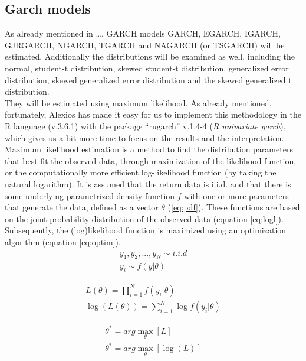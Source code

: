 \documentclass[a4paper, twoside]{templates/ociamthesis}
\begin{document}
\hypertarget{garch-models}{%
\subsection{Garch models}\label{garch-models}}

As already mentioned in \ldots, GARCH models GARCH, EGARCH, IGARCH, GJRGARCH, NGARCH, TGARCH and NAGARCH (or TSGARCH) will be estimated. Additionally the distributions will be examined as well, including the normal, student-t distribution, skewed student-t distribution, generalized error distribution, skewed generalized error distribution and the skewed generalized t distribution. ~\\

They will be estimated using maximum likelihood. As already mentioned, fortunately, Alexios \textcite{alexios2020} has made it easy for us to implement this methodology in the R language (v.3.6.1) with the package ``rugarch'' v.1.4-4 (\emph{R univariate garch}), which gives us a bit more time to focus on the results and the interpretation.~\\

Maximum likelihood estimation is a method to find the distribution parameters that best fit the observed data, through maximization of the likelihood function, or the computationally more efficient log-likelihood function (by taking the natural logarithm). It is assumed that the return data is i.i.d. and that there is some underlying parametrized density function \(f\) with one or more parameters that generate the data, defined as a vector \(\theta\) (\eqref{eq:pdf}). These functions are based on the joint probability distribution of the observed data (equation \eqref{eq:logl}). Subsequently, the (log)likelihood function is maximized using an optimization algorithm (equation \eqref{eq:optim}).~\\

\begin{align} 
  y_1,y_2,...,y_N \sim i.i.d
    \\
  y_i \sim f(y|\theta)
 \label{eq:pdf}
\end{align}

\begin{align} 
 L(\theta) = \prod^N_{i=1}f(y_i|\theta)
  \\
 \log(L(\theta)) = \sum^N_{i=1} \log f(y_i |\theta)
 \label{eq:logl}
\end{align}

\begin{align} 
\theta^{*} = arg \max_{\theta} [ L] \\
\theta^{*} = arg \max_{\theta} [\log(L)]
 \label{eq:optim}
\end{align}
\end{document}
